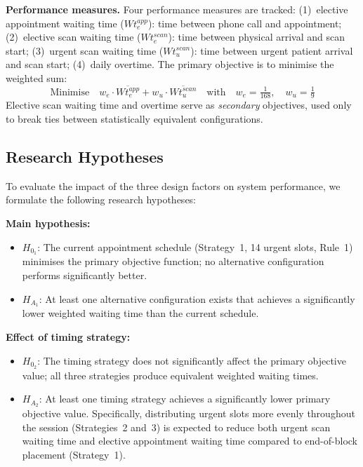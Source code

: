\documentclass[12pt, a4paper]{article}
\begin{document}
\textbf{Performance measures.} Four performance measures are tracked: (1)~elective appointment waiting time ($Wt_e^{app}$): time between phone call and appointment; (2)~elective scan waiting time ($Wt_e^{scan}$): time between physical arrival and scan start; (3)~urgent scan waiting time ($Wt_u^{scan}$): time between urgent patient arrival and scan start; (4)~daily overtime. The primary objective is to minimise the weighted sum:
\[
    \text{Minimise} \quad w_e \cdot \overline{Wt_e^{app}} + w_u \cdot \overline{Wt_u^{scan}}
    \quad \text{with} \quad w_e = \tfrac{1}{168}, \quad w_u = \tfrac{1}{9}
\]
Elective scan waiting time and overtime serve as \textit{secondary} objectives, used only to break ties between statistically equivalent configurations.

\subsection{Research Hypotheses}

To evaluate the impact of the three design factors on system performance, we formulate the following research hypotheses:

\textbf{Main hypothesis:}
\begin{itemize}
    \item $H_{0_1}$: The current appointment schedule (Strategy~1, 14 urgent slots, Rule~1) minimises the primary objective function; no alternative configuration performs significantly better.
    \item $H_{A_1}$: At least one alternative configuration exists that achieves a significantly lower weighted waiting time than the current schedule.
\end{itemize}

\textbf{Effect of timing strategy:}
\begin{itemize}
    \item $H_{0_2}$: The timing strategy does not significantly affect the primary objective value; all three strategies produce equivalent weighted waiting times.
    \item $H_{A_2}$: At least one timing strategy achieves a significantly lower primary objective value. Specifically, distributing urgent slots more evenly throughout the session (Strategies~2 and~3) is expected to reduce both urgent scan waiting time and elective appointment waiting time compared to end-of-block placement (Strategy~1).
\end{itemize}
\end{document}
